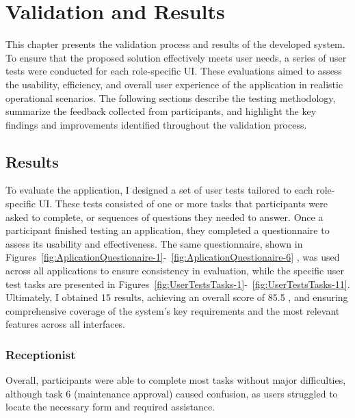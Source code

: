 \chapter{Validation and Results}%
\label{chapter:ValidationandResults}

\begin{introduction}
This chapter presents the validation process and results of the developed system. To ensure that the proposed solution effectively meets user needs, a series of user tests were conducted for each role-specific \ac{UI}. These evaluations aimed to assess the usability, efficiency, and overall user experience of the application in realistic operational scenarios.
The following sections describe the testing methodology, summarize the feedback collected from participants, and highlight the key findings and improvements identified throughout the validation process.
\end{introduction} 


\section{Results}


To evaluate the application, I designed a set of user tests tailored to each role-specific \ac{UI}. These tests consisted of one or more tasks that participants were asked to complete, or sequences of questions they needed to answer. Once a participant finished testing an application, they completed a questionnaire to assess its usability and effectiveness. The same questionnaire, shown in Figures~\ref{fig:AplicationQuestionaire-1}-~\ref{fig:AplicationQuestionaire-6} \cite{Laubheimer_2025}, was used across all applications to ensure consistency in evaluation, while the specific user test tasks are presented in Figures~\ref{fig:UserTestsTasks-1}-~\ref{fig:UserTestsTasks-11}. Ultimately, I obtained 15 results, achieving an overall score of 85.5 \cite{T_2021}, and ensuring comprehensive coverage of the system’s key requirements and the most relevant features across all interfaces.

\subsection{Receptionist}
Overall, participants were able to complete most tasks without major difficulties, although task 6 (maintenance approval) caused confusion, as users struggled to locate the necessary form and required assistance.

